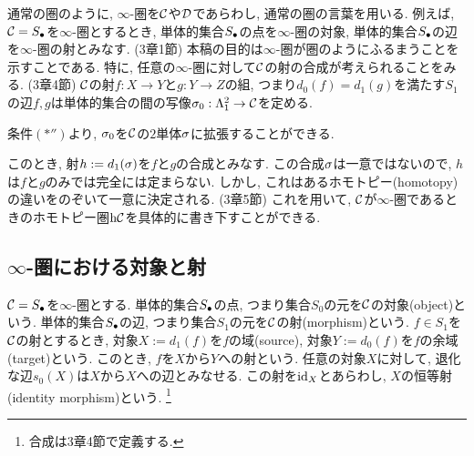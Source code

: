 \documentclass[uplatex, a4paper, 14Q, dvipdfmx]{jsreport}
\begin{document}
通常の圏のように, $\infty$-圏を$\calC$や$\calD$であらわし, 通常の圏の言葉を用いる. 
例えば, $\calC=\S$を$\infty$-圏とするとき, 単体的集合$\S$の点を$\infty$-圏の対象, 単体的集合$\S$の辺を$\infty$-圏の射とみなす. (3章1節)
本稿の目的は$\infty$-圏が圏のようにふるまうことを示すことである. 
特に, 任意の$\infty$-圏に対して$\calC$の射の合成が考えられることをみる. (3章4節)
$\calC$の射$f: X \to Y$と$g: Y \to Z$の組, つまり$d_0(f)=d_1(g)$を満たす$S_1$の辺$f,g$は単体的集合の間の写像$\si_0: \Lambda^2_1 \to \calC$を定める. 
\begin{center}
\end{center}
条件$(\ast'')$より, $\si_0$を$\calC$の$2$単体$\si$に拡張することができる. 
\begin{center}
\end{center}
このとき, 射$h:=d_1(\si)$を$f$と$g$の合成とみなす. 
この合成$\si$は一意ではないので, $h$は$f$と$g$のみでは完全には定まらない.
しかし, これはあるホモトピー(homotopy)の違いをのぞいて一意に決定される. (3章5節)
これを用いて, $\calC$が$\infty$-圏であるときのホモトピー圏$\h \calC$を具体的に書き下すことができる.

\subsection{\texorpdfstring{$\infty$}{infty}-圏における対象と射}

\begin{definition}
  $\calC=\S$を$\infty$-圏とする. 
  単体的集合$\S$の点, つまり集合$S_0$の元を$\calC$の対象(object)という. 
  単体的集合$\S$の辺, つまり集合$S_1$の元を$\calC$の射(morphism)という. 
  $f \in S_1$を$\calC$の射とするとき, 対象$X:=d_1(f)$を$f$の域(source), 対象$Y:=d_0(f)$を$f$の余域(target)という. 
  このとき, $f$を$X$から$Y$への射という. 
  任意の対象$X$に対して, 退化な辺$s_0(X)$は$X$から$X$への辺とみなせる. 
  この射を$\id_X$とあらわし, $X$の恒等射(identity morphism)という. 
  \footnote{
    合成は3章4節で定義する. 
  }
\end{definition}
\end{document}
